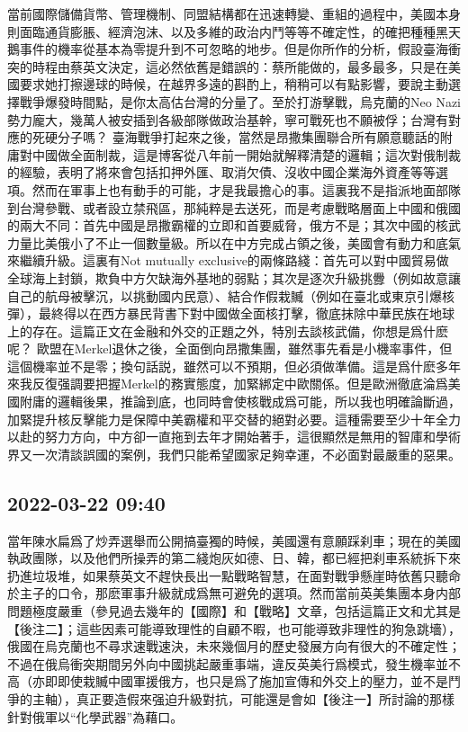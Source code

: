 \documentclass[twocolumn]{ctexart}
\begin{document}
當前國際儲備貨幣、管理機制、同盟結構都在迅速轉變、重組的過程中，美國本身則面臨通貨膨脹、經濟泡沫、以及多維的政治内鬥等等不確定性，的確把種種黑天鵝事件的機率從基本為零提升到不可忽略的地步。但是你所作的分析，假設臺海衝突的時程由蔡英文決定，這必然依舊是錯誤的：蔡所能做的，最多最多，只是在美國要求她打擦邊球的時候，在越界多遠的斟酌上，稍稍可以有點影響，要說主動選擇戰爭爆發時間點，是你太高估台灣的分量了。至於打游擊戰，烏克蘭的Neo Nazi勢力龐大，幾萬人被安插到各級部隊做政治基幹，寧可戰死也不願被俘；台灣有對應的死硬分子嗎？
臺海戰爭打起來之後，當然是昂撒集團聯合所有願意聽話的附庸對中國做全面制裁，這是博客從八年前一開始就解釋清楚的邏輯；這次對俄制裁的經驗，表明了將來會包括扣押外匯、取消欠債、沒收中國企業海外資產等等選項。然而在軍事上也有動手的可能，才是我最擔心的事。這裏我不是指派地面部隊到台灣參戰、或者設立禁飛區，那純粹是去送死，而是考慮戰略層面上中國和俄國的兩大不同：首先中國是昂撒霸權的立即和首要威脅，俄方不是；其次中國的核武力量比美俄小了不止一個數量級。所以在中方完成占領之後，美國會有動力和底氣來繼續升級。這裏有Not mutually exclusive的兩條路綫：首先可以對中國貿易做全球海上封鎖，欺負中方欠缺海外基地的弱點；其次是逐次升級挑釁（例如故意讓自己的航母被擊沉，以挑動國内民意）、結合作假栽贓（例如在臺北或東京引爆核彈），最終得以在西方暴民背書下對中國做全面核打擊，徹底抹除中華民族在地球上的存在。這篇正文在金融和外交的正題之外，特別去談核武備，你想是爲什麽呢？
歐盟在Merkel退休之後，全面倒向昂撒集團，雖然事先看是小機率事件，但這個機率並不是零；換句話説，雖然可以不預期，但必須做準備。這是爲什麽多年來我反復强調要把握Merkel的務實態度，加緊綁定中歐關係。但是歐洲徹底淪爲美國附庸的邏輯後果，推論到底，也同時會使核戰成爲可能，所以我也明確論斷過，加緊提升核反擊能力是保障中美霸權和平交替的絕對必要。這種需要至少十年全力以赴的努力方向，中方卻一直拖到去年才開始著手，這很顯然是無用的智庫和學術界又一次清談誤國的案例，我們只能希望國家足夠幸運，不必面對最嚴重的惡果。
\subsection*{2022-03-22 09:40}

當年陳水扁爲了炒弄選舉而公開搞臺獨的時候，美國還有意願踩刹車；現在的美國執政團隊，以及他們所操弄的第二綫炮灰如德、日、韓，都已經把刹車系統拆下來扔進垃圾堆，如果蔡英文不趕快長出一點戰略智慧，在面對戰爭懸崖時依舊只聽命於主子的口令，那麽軍事升級就成爲無可避免的選項。然而當前英美集團本身内部問題極度嚴重（參見過去幾年的【國際】和【戰略】文章，包括這篇正文和尤其是【後注二】；這些因素可能導致理性的自顧不暇，也可能導致非理性的狗急跳墻），俄國在烏克蘭也不尋求速戰速決，未來幾個月的歷史發展方向有很大的不確定性；不過在俄烏衝突期間另外向中國挑起嚴重事端，違反英美行爲模式，發生機率並不高（亦即即使栽贓中國軍援俄方，也只是爲了施加宣傳和外交上的壓力，並不是鬥爭的主軸），真正要造假來强迫升級對抗，可能還是會如【後注一】所討論的那樣針對俄軍以“化學武器”為藉口。
\end{document}
